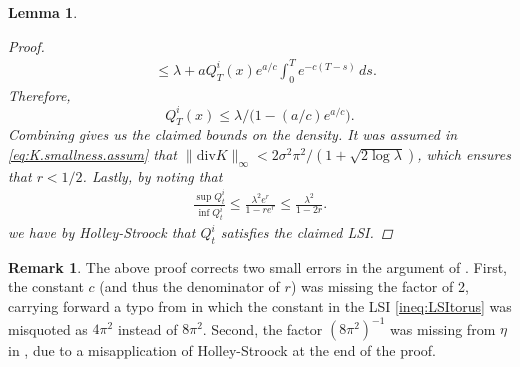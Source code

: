 \documentclass[11pt,reqno]{amsart}
\numberwithin{equation}{section}
\newtheorem{lemma}[theorem]{Lemma}
\theoremstyle{definition}
\newtheorem{remark}[theorem]{Remark}
\def\diver{\mathrm{div}}
\begin{document}
\begin{lemma}
\begin{proof}
\begin{align*}
			& \le \lambda + a  Q_T^i(x) e^{a/c}\int_0^T e^{-c (T - s)}\, ds.
		\end{align*}
		Therefore, 
		\begin{equation*}
			Q^{i}_T(x) \le   \lambda \big/\big(1 -(a/c)e^{a/c}\big).
		\end{equation*}
		Combining gives us the claimed bounds on the density. It was assumed in \eqref{eq:K.smallness.assum} that $\|\diver K\|_\infty < 2\sigma^2\pi^2/(1+\sqrt{2\log \lambda})$, which ensures that $r < 1/2$. Lastly, by noting that
		\begin{align}
			\frac{\sup Q^{i}_t}{\inf Q^{i}_t} \le  \frac{\lambda^2 e^{r}}{1 - r e^{r}} \le \frac{\lambda^2}{1 - 2r}.
		\end{align}
		we have by Holley-Stroock \cite[Proposition 5.1.6]{bakry2014analysis} that $Q^{i}_t$ satisfies the claimed LSI.
	\end{proof}
	\end{lemma}
 
 \begin{remark}
 The above proof corrects two small errors in the argument of \cite[Corollary 2.9]{lacker2023sharp}. First, the constant $c$ (and thus the denominator of $r$) was missing the factor of 2, carrying forward a typo from \cite[Equation (3.3)]{carrillo2020long} in which the constant in the LSI \eqref{ineq:LSItorus} was misquoted as $4\pi^2$ instead of $8\pi^2$. Second, the factor $(8\pi^2)^{-1}$ was missing from $\eta$ in \cite[Corollary 2.9]{lacker2023sharp}, due to a misapplication of Holley-Stroock at  the end of the proof.
 \end{remark}
 



 

\end{document}
